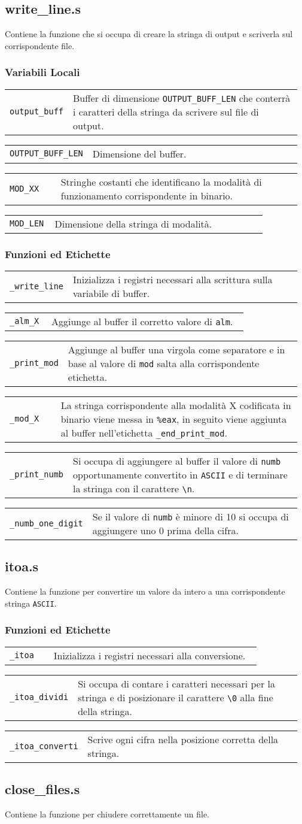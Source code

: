 \documentclass[a4paper,11pt]{article}
\newcommand{\myparagraph}[2]{
	\begin{table}[!ht]
		\begin{tabular}{p{0.17\linewidth} | p{0.8\linewidth}}
			\texttt{#1} & #2
		\end{tabular}
	\end{table}
			}
\begin{document}
	\subsection{write\_line.s}
	Contiene la funzione che si occupa di creare la stringa di output e scriverla sul corrispondente file. 
	\subsubsection{Variabili Locali}
	\myparagraph{output\_buff}{Buffer di dimensione \texttt{OUTPUT\_BUFF\_LEN} che conterrà i caratteri della stringa da scrivere sul file di output.}
	\myparagraph{OUTPUT\_BUFF\_LEN}{Dimensione del buffer.}
	\myparagraph{MOD\_XX}{Stringhe costanti che identificano la modalità di funzionamento corrispondente in binario.}
	\myparagraph{MOD\_LEN}{Dimensione della stringa di modalità.}
	
	\subsubsection{Funzioni ed Etichette}
	\myparagraph{\_write\_line}{Inizializza i registri necessari alla scrittura sulla variabile di buffer.}
	\myparagraph{\_alm\_X}{Aggiunge al buffer il corretto valore di \texttt{alm}.}
	\myparagraph{\_print\_mod}{Aggiunge al buffer una virgola come separatore e in base al valore di \texttt{mod} salta alla corrispondente etichetta.}
	\myparagraph{\_mod\_X}{La stringa corrispondente alla modalità X codificata in binario viene messa in \texttt{\%eax}, in seguito viene aggiunta al buffer nell'etichetta \texttt{\_end\_print\_mod}.}
	\myparagraph{\_print\_numb}{Si occupa di aggiungere al buffer il valore di \texttt{numb} opportunamente convertito in \texttt{ASCII} e di terminare la stringa con il carattere \texttt{\textbackslash n}.}
	\myparagraph{\_numb\_one\_digit}{Se il valore di \texttt{numb} è minore di 10 si occupa di aggiungere uno 0 prima della cifra.}
	
	\subsection{itoa.s}
	Contiene la funzione per convertire un valore da intero a una corrispondente stringa \texttt{ASCII}.
	\subsubsection{Funzioni ed Etichette} 
	\myparagraph{\_itoa}{Inizializza i registri necessari alla conversione.}
	\myparagraph{\_itoa\_dividi}{Si occupa di contare i caratteri necessari per la stringa e di posizionare il carattere \texttt{\textbackslash 0} alla fine della stringa.}
	\myparagraph{\_itoa\_converti}{Scrive ogni cifra nella posizione corretta della stringa.}
	
	\subsection{close\_files.s}
	Contiene la funzione per chiudere correttamente un file. 
	

	
	
\end{document}
